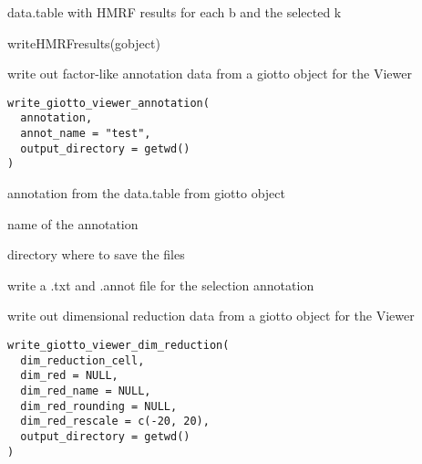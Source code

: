 \documentclass[a4paper]{book}
\begin{document}
%
\begin{Value}
data.table with HMRF results for each b and the selected k
\end{Value}
%
\begin{Examples}
\begin{ExampleCode}
    writeHMRFresults(gobject)
\end{ExampleCode}
\end{Examples}
%
\begin{Description}\relax
write out factor-like annotation data from a giotto object for the Viewer
\end{Description}
%
\begin{Usage}
\begin{verbatim}
write_giotto_viewer_annotation(
  annotation,
  annot_name = "test",
  output_directory = getwd()
)
\end{verbatim}
\end{Usage}
%
\begin{Arguments}
\begin{ldescription}
\item[\code{annotation}] annotation from the data.table from giotto object

\item[\code{annot\_name}] name of the annotation

\item[\code{output\_directory}] directory where to save the files
\end{ldescription}
\end{Arguments}
%
\begin{Value}
write a .txt and .annot file for the selection annotation
\end{Value}
%
\begin{Description}\relax
write out dimensional reduction data from a giotto object for the Viewer
\end{Description}
%
\begin{Usage}
\begin{verbatim}
write_giotto_viewer_dim_reduction(
  dim_reduction_cell,
  dim_red = NULL,
  dim_red_name = NULL,
  dim_red_rounding = NULL,
  dim_red_rescale = c(-20, 20),
  output_directory = getwd()
)
\end{verbatim}
\end{Usage}
\end{document}
